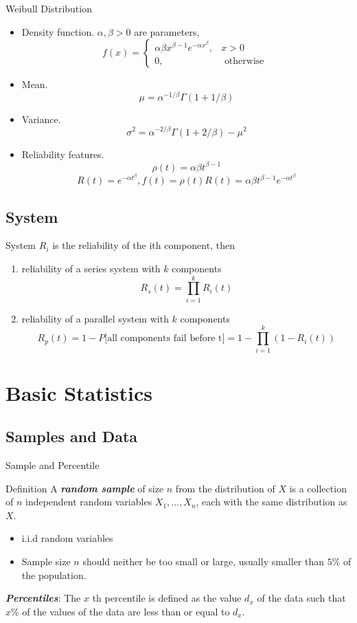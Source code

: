 \documentclass{beamer}
\newcommand{\bb}[1]{\textcolor{antiquefuchsia}{\textbf{\textit{#1}}}}
\begin{document}
\begin{frame}{Weibull Distribution}
\begin{itemize}
\item Density function. $\alpha, \beta>0$ are parameters,
$$
f(x)= \begin{cases}\alpha \beta x^{\beta-1} e^{-\alpha x^{\beta}}, & x>0 \\ 0, & \text { otherwise }\end{cases}
$$
\item Mean.
$$
\mu=\alpha^{-1 / \beta} \Gamma(1+1 / \beta)
$$
\item Variance.
$$
\sigma^{2}=\alpha^{-2 / \beta} \Gamma(1+2 / \beta)-\mu^{2}
$$
\item Reliability features.
$$
\rho(t)=\alpha \beta t^{\beta-1}$$$$ R(t)=e^{-\alpha t^{\beta}}, f(t)=\rho(t) R(t)=\alpha \beta t^{\beta-1} e^{-\alpha t^{\beta}}
$$
\end{itemize}
\end{frame}

\subsection{System}
\begin{frame}{System}
$R_{i}$ is the reliability of the ith component, then
\begin{enumerate}
\item reliability of a series system with $k$ components
$$
R_{s}(t)=\prod_{i=1}^{k} R_{i}(t)
$$
\item reliability of a parallel system with $k$ components
$$R_{p}(t)=1-P\text{[all components fail before t]}=1-\prod_{i=1}^{k}\left(1-R_{i}(t)\right)$$
\end{enumerate}
\end{frame}


\section{Basic Statistics}
\subsection{Samples and Data}
\begin{frame}{Sample and Percentile}
\begin{block}{Definition}
A \bb{random sample} of size $n$ from the distribution of $X$ is a collection of $n$ independent random variables $X_{1}, \ldots, X_{n}$, each with the same distribution as $X$.
\begin{itemize}
\item i.i.d random variables
\item Sample size $n$ should neither be too small or large, usually smaller than $5 \%$ of the population.
\end{itemize}

\bb{Percentiles}: The $x$ th percentile is defined as the value $d_{x}$ of the data such that $x \%$ of the values of the data are less than or equal to $d_{x}$.
\end{block}
\end{frame}
\end{document}
